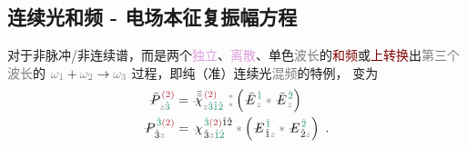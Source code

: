\subsection{连续光和频 - 电场本征复振幅方程}\label{ssec:SFG_discrete}

对于\textcolor{NavyBlue}{非脉冲}/\textcolor{NavyBlue}{非连续谱}，而是两个\textcolor{Plum}{独立}、\textcolor{Plum}{离散}、\textcolor{NavyBlue}{单色}\textcolor{gray}{波长}的\textcolor{Maroon}{和频}或\textcolor{Maroon}{上转换}出\textcolor{gray}{第三个波长}的 $\mathcolor{gray}{\omega}_{\textcolor{gray}{1}} + \mathcolor{gray}{\omega}_{\textcolor{gray}{2}} \to \mathcolor{gray}{\omega}_{\textcolor{gray}{3}}$ 过程，即纯\textcolor{NavyBlue}{（准）连续光}\textcolor{gray}{混频}的特例， 变为
\begin{subequations} \label{eq:DP^(2)-3_12}
	\begin{align}
		\Xint{\mathcolor{gray}{-}}{30}{\bar{P}}^{\;\! \textcolor{Maroon}{(2)} }_{\;\! \mathcolor{gray}{z} \textcolor{PineGreen}{\hat{3}}} &= \Xint{{}^{}_{\mathcolor{gray}{-}}}{23}{\bar{\bar{\bar{\chi}}}}^{\;\!  \textcolor{Maroon}{(2)}}_{\mathcolor{gray}{z} \textcolor{PineGreen}{\hat{3} \hat{1} \hat{2}} } ~{}^{\mathcolor{gray}{*}}_{\mathcolor{gray}{*}} \left( \Xint{\mathcolor{gray}{-}}{295}{\bar{E}}^{\;\! \textcolor{PineGreen}{\hat{1}} }_{\;\! \mathcolor{gray}{z} } \mathcolor{gray}{*} \Xint{\mathcolor{gray}{-}}{295}{\bar{E}}^{\;\! \textcolor{PineGreen}{\hat{2}} }_{\;\! \mathcolor{gray}{z} } \right) \label{eq:vec-DP^(2)-3_12} \\
		\Xint{\mathcolor{gray}{-}}{30}{P}^{\;\! \textcolor{PineGreen}{\hat{3}} \textcolor{Maroon}{(2)} }_{\;\! \hat{3}\mathcolor{gray}{z}} &= \Xint{{}^{}_{\mathcolor{gray}{-}}}{23}{\chi}^{\;\! \textcolor{PineGreen}{\hat{3}} \textcolor{Maroon}{(2)} \hat{1} \hat{2} }_{\;\! \hat{3} \mathcolor{gray}{z} \textcolor{PineGreen}{\hat{1} \hat{2}}} \mathcolor{gray}{*} \left( \Xint{\mathcolor{gray}{-}}{295}{E}^{\;\!\textcolor{PineGreen}{\hat{1}}}_{\;\! \hat{1} \mathcolor{gray}{z}} \mathcolor{gray}{*} \Xint{\mathcolor{gray}{-}}{295}{E}^{\;\!\textcolor{PineGreen}{\hat{2}}}_{\;\! \hat{2} \mathcolor{gray}{z}} \right) ~. \label{eq:components-DP^(2)-3_12}
	\end{align}
\end{subequations}
